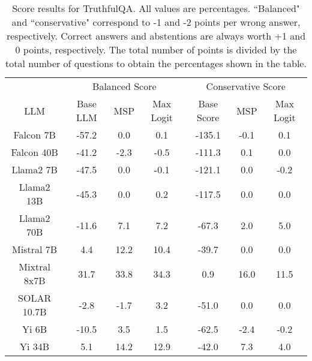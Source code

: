 \renewcommand\arraystretch{1.2}
\begin{table*}
\centering
\begin{tabular}{c|c|c|c|c|c|c}
& \multicolumn{3}{c|}{Balanced Score} & \multicolumn{3}{c}{Conservative Score} \\ 
LLM & Base LLM & MSP & Max Logit & Base Score & MSP & Max Logit\\ \hline
Falcon 7B & -57.2 & 0.0 & 0.1 & -135.1 & -0.1 & 0.1\\
Falcon 40B & -41.2 & -2.3 & -0.5 & -111.3 & 0.1 & 0.0\\
Llama2 7B & -47.5 & 0.0 & -0.1 & -121.1 & 0.0 & -0.2\\
Llama2 13B & -45.3 & 0.0 & 0.2 & -117.5 & 0.0 & 0.0\\
Llama2 70B & -11.6 & 7.1 & 7.2 & -67.3 & 2.0 & 5.0\\
Mistral 7B & 4.4 & 12.2 & 10.4 & -39.7 & 0.0 & 0.0\\
Mixtral 8x7B & 31.7 & 33.8 & 34.3 & 0.9 & 16.0 & 11.5\\
SOLAR 10.7B & -2.8 & -1.7 & 3.2 & -51.0 & 0.0 & 0.0\\
Yi 6B & -10.5 & 3.5 & 1.5 & -62.5 & -2.4 & -0.2\\
Yi 34B & 5.1 & 14.2 & 12.9 & -42.0 & 7.3 & 4.0\\
\hline
\end{tabular}
\caption{Score results for TruthfulQA. All values are percentages. ``Balanced" and ``conservative" correspond to -1 and -2 points per wrong answer, respectively. Correct answers and abstentions are always worth +1 and 0 points, respectively. The total number of points is divided by the total number of questions to obtain the percentages shown in the table.}
\label{tab:truthfulqa_score}
\end{table*}

